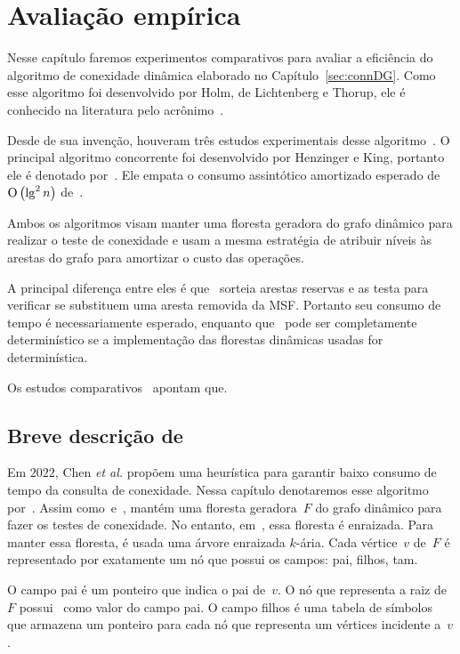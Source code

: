 \chapter{Avaliação empírica}
\label{sec:avaliacao-empirica}

Nesse capítulo faremos experimentos comparativos para avaliar a eficiência do algoritmo de conexidade dinâmica elaborado no Capítulo~\ref{sec:connDG}. Como esse algoritmo foi desenvolvido  por Holm, de Lichtenberg e Thorup, ele é conhecido na literatura pelo acrônimo~\HDT.

Desde de sua invenção, houveram três estudos experimentais desse algoritmo~\cite{EmpiricalStudy1997, EmpiricalStudy2002, Zaroliagis2002}.
O principal algoritmo concorrente foi desenvolvido por Henzinger e King, portanto ele é denotado por~\HK. Ele empata o consumo assintótico amortizado esperado de $\text{O}\left(\lg^2 n\right)$ de~\HDT.

Ambos os algoritmos visam manter uma floresta geradora do grafo dinâmico para realizar o teste de conexidade e usam a mesma estratégia de atribuir níveis às arestas do grafo para amortizar o custo das operações.

A principal diferença entre eles é que~\HK{} sorteia arestas reservas e as testa para verificar se substituem uma aresta removida da MSF. Portanto seu consumo de tempo é necessariamente esperado, enquanto que~\HDT{} pode ser completamente determinístico se a implementação das florestas dinâmicas usadas for determinística. 



Os estudos comparativos~\cite{EmpiricalStudy1997, EmpiricalStudy2002, Zaroliagis2002} apontam que.


\section{Breve descrição de~\CLHB{}}


Em $2022$, Chen \textit{et al.}\cite{QC22} propõem uma heurística para garantir baixo consumo de tempo da consulta de conexidade. Nessa capítulo denotaremos esse algoritmo por~\CLHB.
Assim como~\HDT e~\HK, \CLHB{} mantém uma floresta geradora~$F$ do grafo dinâmico para fazer os testes de conexidade.
No entanto, em~\CLHB{}, essa floresta é enraizada.
Para manter essa floresta, é usada uma árvore enraizada $k$-ária.
Cada vértice~$v$ de~$F$ é representado por exatamente um nó que possui os campos: pai, filhos, tam.

O campo pai é um ponteiro que indica o pai de~$v$. O nó que representa a raiz de~$F$ possui~\Nil{} como valor do campo pai.
O campo filhos é uma tabela de símbolos que armazena um ponteiro para cada nó que representa um vértices incidente a~$v$.


